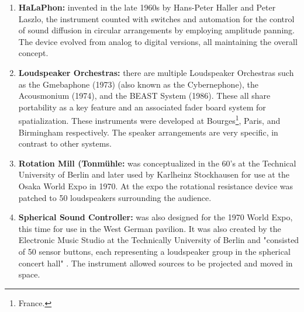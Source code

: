 \begin{enumerate}

    \item \textbf{HaLaPhon:} invented in the late 1960s by Hans-Peter Haller and Peter Laszlo, the instrument counted with switches and automation for the control of sound diffusion in circular arrangements by employing amplitude panning. The device evolved from analog to digital versions, all maintaining the overall concept.
    
    \item \textbf{Loudspeaker Orchestras:} there are multiple Loudspeaker Orchestras such as the Gmebaphone (1973) (also known as the Cybernephone), the Acousmonium (1974), and the BEAST System (1986). These all share portability as a key feature and an associated fader board system for spatialization. These instruments were developed at Bourges\footnote{France.}, Paris, and Birmingham respectively. The speaker arrangements are very specific, in contrast to other systems.
    
    
    
    
    \item \textbf{Rotation Mill (Tonmühle:} was conceptualized in the 60's at the Technical University of Berlin and later used by Karlheinz Stockhausen for use at the Osaka World Expo in 1970. At the expo the rotational resistance device was patched to 50 loudspeakers surrounding the audience.
    
    
    \item \textbf{Spherical Sound Controller:} was also designed for the 1970 World Expo, this time for use in the West German pavilion. It was also created by the Electronic Music Studio at the Technically University of Berlin and "consisted of 50 sensor buttons, each representing a loudspeaker group in the spherical concert hall" \cite{pysiewicz2017instruments}. The instrument allowed sources to be projected and moved in space.
    

\end{enumerate}
